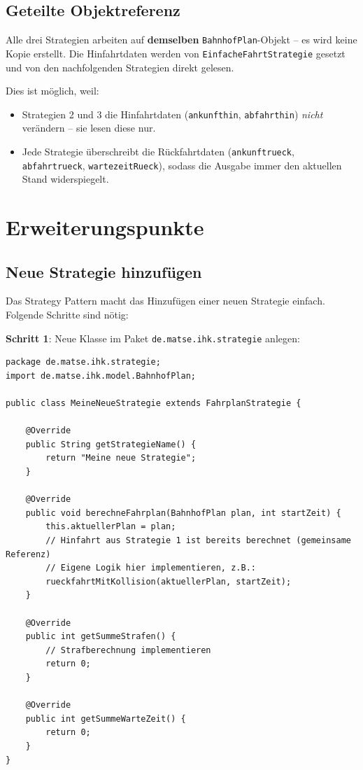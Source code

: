 \documentclass[12pt,a4paper]{article}
\begin{document}
\subsection{Geteilte Objektreferenz}

\begin{designbox}
Alle drei Strategien arbeiten auf \textbf{demselben} \texttt{BahnhofPlan}-Objekt -- es wird keine Kopie erstellt. Die Hinfahrtdaten werden von \texttt{EinfacheFahrtStrategie} gesetzt und von den nachfolgenden Strategien direkt gelesen.
\end{designbox}

Dies ist möglich, weil:
\begin{itemize}
    \item Strategien 2 und 3 die Hinfahrtdaten (\texttt{ankunfthin}, \texttt{abfahrthin}) \emph{nicht} verändern -- sie lesen diese nur.
    \item Jede Strategie überschreibt die Rückfahrtdaten (\texttt{ankunftrueck}, \texttt{abfahrtrueck}, \texttt{wartezeitRueck}), sodass die Ausgabe immer den aktuellen Stand widerspiegelt.
\end{itemize}

\section{Erweiterungspunkte}

\subsection{Neue Strategie hinzufügen}

Das Strategy Pattern macht das Hinzufügen einer neuen Strategie einfach. Folgende Schritte sind nötig:

\textbf{Schritt 1}: Neue Klasse im Paket \texttt{de.matse.ihk.strategie} anlegen:

\begin{lstlisting}[caption={Neue Strategie -- Grundstruktur}]
package de.matse.ihk.strategie;
import de.matse.ihk.model.BahnhofPlan;

public class MeineNeueStrategie extends FahrplanStrategie {

    @Override
    public String getStrategieName() {
        return "Meine neue Strategie";
    }

    @Override
    public void berechneFahrplan(BahnhofPlan plan, int startZeit) {
        this.aktuellerPlan = plan;
        // Hinfahrt aus Strategie 1 ist bereits berechnet (gemeinsame Referenz)
        // Eigene Logik hier implementieren, z.B.:
        rueckfahrtMitKollision(aktuellerPlan, startZeit);
    }

    @Override
    public int getSummeStrafen() {
        // Strafberechnung implementieren
        return 0;
    }

    @Override
    public int getSummeWarteZeit() {
        return 0;
    }
}
\end{lstlisting}
\end{document}
